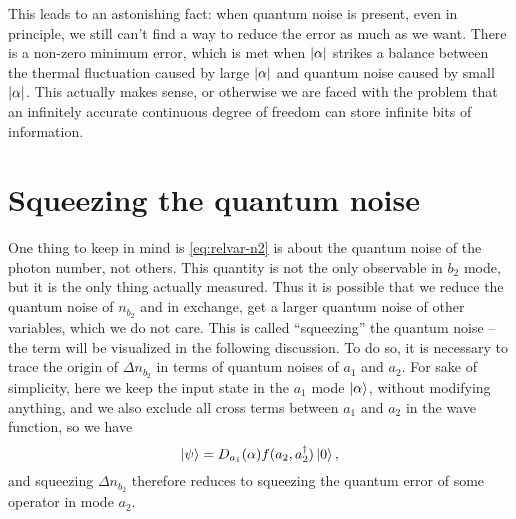 \documentclass[hyperref, a4paper]{article}
\begin{document}
This leads to an astonishing fact:
when quantum noise is present, 
even in principle, 
we still can't find a way to reduce the error as much as we want.
There is a non-zero minimum error,
which is met when $\abs{\alpha}$ strikes a balance 
between the thermal fluctuation caused by large $\abs{\alpha}$
and quantum noise caused by small $\abs{\alpha}$.
This actually makes sense,
or otherwise we are faced with the problem 
that an infinitely accurate continuous degree of freedom can store infinite bits of information.

\section{Squeezing the quantum noise}\label{sec:squeezing}

One thing to keep in mind is \eqref{eq:relvar-n2} 
is about the quantum noise of the photon number, not others.
This quantity is not the only observable in $b_2$ mode,
but it is the only thing actually measured.
Thus it is possible that we reduce the quantum noise of $n_{b_2}$
and in exchange, get a larger quantum noise of other variables,
which we do not care.
This is called ``squeezing'' the quantum noise
-- the term will be visualized in the following discussion.
To do so, it is necessary to trace the origin of $\Delta{n_{b_2}}$ 
in terms of quantum noises of $a_1$ and $a_2$. 
For sake of simplicity,
here we keep the input state in the $a_1$ mode $\ket{\alpha}$,
without modifying anything,
and we also exclude all cross terms between $a_1$ and $a_2$ in the wave function, 
so we have 
\begin{equation}
    \ket{\psi} = D_{a_1}(\alpha) f(a_2, a_2^\dagger) \ket{0},
    \label{eq:coherent-plus-squeeze}
\end{equation}
and squeezing $\Delta{n_{b_2}}$ therefore reduces to squeezing the quantum error of some operator in mode $a_2$.
\end{document}

